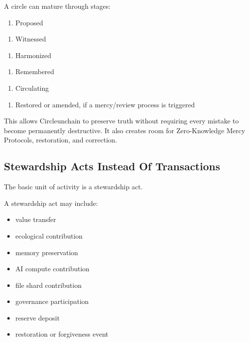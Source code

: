 ﻿\documentclass[12pt]{article}
\begin{document}
A circle can mature through stages:

\begin{enumerate}
  \item Proposed
\end{enumerate}
\begin{enumerate}
  \item Witnessed
\end{enumerate}
\begin{enumerate}
  \item Harmonized
\end{enumerate}
\begin{enumerate}
  \item Remembered
\end{enumerate}
\begin{enumerate}
  \item Circulating
\end{enumerate}
\begin{enumerate}
  \item Restored or amended, if a mercy/review process is triggered
\end{enumerate}

This allows Circleunchain to preserve truth without requiring every mistake to become permanently destructive. It also creates room for Zero-Knowledge Mercy Protocols, restoration, and correction.

\subsection{Stewardship Acts Instead Of Transactions}


The basic unit of activity is a stewardship act.

A stewardship act may include:

\begin{itemize}
  \item value transfer
\end{itemize}
\begin{itemize}
  \item ecological contribution
\end{itemize}
\begin{itemize}
  \item memory preservation
\end{itemize}
\begin{itemize}
  \item AI compute contribution
\end{itemize}
\begin{itemize}
  \item file shard contribution
\end{itemize}
\begin{itemize}
  \item governance participation
\end{itemize}
\begin{itemize}
  \item reserve deposit
\end{itemize}
\begin{itemize}
  \item restoration or forgiveness event
\end{itemize}
\end{document}
